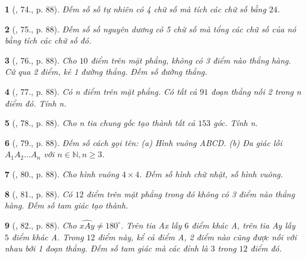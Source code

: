 \documentclass{article}
\newtheorem{baitoan}{}
\begin{document}
\begin{baitoan}[\cite{Binh_Toan_6_tap_2}, 74., p. 88]
	Đếm số số tự nhiên có 4 chữ số mà tích các chữ số bằng $24$.
\end{baitoan}

\begin{baitoan}[\cite{Binh_Toan_6_tap_2}, 75., p. 88]
	Đếm số số nguyên dương có 5 chữ số mà tổng các chữ số của nó bằng tích các chữ số đó.
\end{baitoan}

\begin{baitoan}[\cite{Binh_Toan_6_tap_2}, 76., p. 88]
	Cho $10$ điểm trên mặt phẳng, không có 3 điểm nào thẳng hàng. Cứ qua 2 điểm, kẻ 1 đường thẳng. Đếm số đường thẳng.
\end{baitoan}

\begin{baitoan}[\cite{Binh_Toan_6_tap_2}, 77., p. 88]
	Có n điểm trên mặt phẳng. Có tất cả $91$ đoạn thẳng nối 2 trong n điểm đó. Tính n.
\end{baitoan}

\begin{baitoan}[\cite{Binh_Toan_6_tap_2}, 78., p. 88]
	Cho n tia chung gốc tạo thành tất cả $153$ góc. Tính n.
\end{baitoan}

\begin{baitoan}[\cite{Binh_Toan_6_tap_2}, 79., p. 88]
	Đếm số cách gọi tên: (a) Hình vuông ABCD. (b) Đa giác lồi $A_1A_2\ldots A_n$ với $n\in\mathbb{N},n\ge3$.
\end{baitoan}

\begin{baitoan}[\cite{Binh_Toan_6_tap_2}, 80., p. 88]
	Cho hình vuông $4\times4$. Đếm số hình chữ nhật, số hình vuông. 
\end{baitoan}

\begin{baitoan}[\cite{Binh_Toan_6_tap_2}, 81., p. 88]
	Có $12$ điểm trên mặt phẳng trong đó không có 3 điểm nào thẳng hàng. Đếm số tam giác tạo thành.
\end{baitoan}

\begin{baitoan}[\cite{Binh_Toan_6_tap_2}, 82., p. 88]
	Cho $\widehat{xAy}\ne180^\circ$. Trên tia Ax lấy $6$ điểm khác A, trên tia Ay lấy $5$ điểm khác A. Trong $12$ điểm này, kể cả điểm A, 2 điểm nào cũng được nối với nhau bởi 1 đoạn thẳng. Đếm số tam giác mà các đỉnh là $3$ trong $12$ điểm đó.
\end{baitoan}
\end{document}
